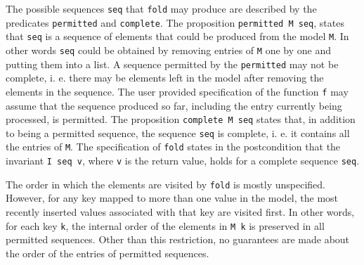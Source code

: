 \documentclass[10pt,a4paper]{article}
\begin{document}
The possible sequences \texttt{seq} that \texttt{fold} may produce are described by the predicates \texttt{permitted} and \texttt{complete}. The proposition \texttt{permitted M seq}, states that \texttt{seq} is a sequence of elements that could be produced from the model \texttt{M}. In other words \texttt{seq} could be obtained by removing entries of \texttt{M} one by one and putting them into a list. A sequence permitted by the \texttt{permitted} may not be complete, i. e. there may be elements left in the model after removing the elements in the sequence. The user provided specification of the function \texttt{f} may assume that the sequence produced so far, including the entry currently being processed, is permitted. The proposition \texttt{complete M seq} states that, in addition to being a permitted sequence, the sequence \texttt{seq} is complete, i. e. it contains all the entries of \texttt{M}. The specification of \texttt{fold} states in the postcondition that the invariant \texttt{I seq v}, where \texttt{v} is the return value, holds for a complete sequence \texttt{seq}.

The order in which the elements are visited by \texttt{fold} is mostly unspecified. However, for any key mapped to more than one value in the model, the most recently inserted values associated with that key are visited first. In other words, for each key \texttt{k}, the internal order of the elements in \texttt{M k} is preserved in all permitted sequences. Other than this restriction, no guarantees are made about the order of the entries of permitted sequences.
\end{document}
